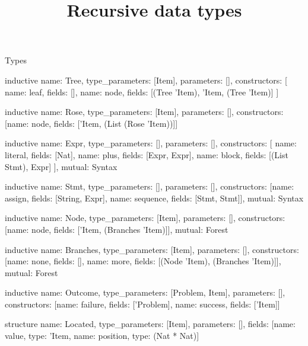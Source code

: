 \begin{lexlean}{Types}
\title{Recursive data types}
\begin{semanticmodule}
inductive{
  name: Tree,
  type_parameters: [Item],
  parameters: [],
  constructors: [
    {name: leaf, fields: []},
    {name: node, fields: [(Tree 'Item), 'Item, (Tree 'Item)]}
  ]
}

inductive{
  name: Rose,
  type_parameters: [Item],
  parameters: [],
  constructors: [{name: node, fields: ['Item, (List (Rose 'Item))]}]
}

inductive{
  name: Expr,
  type_parameters: [],
  parameters: [],
  constructors: [
    {name: literal, fields: [Nat]},
    {name: plus, fields: [Expr, Expr]},
    {name: block, fields: [(List Stmt), Expr]}
  ],
  mutual: Syntax
}

inductive{
  name: Stmt,
  type_parameters: [],
  parameters: [],
  constructors: [{name: assign, fields: [String, Expr]}, {name: sequence, fields: [Stmt, Stmt]}],
  mutual: Syntax
}

inductive{
  name: Node,
  type_parameters: [Item],
  parameters: [],
  constructors: [{name: node, fields: ['Item, (Branches 'Item)]}],
  mutual: Forest
}

inductive{
  name: Branches,
  type_parameters: [Item],
  parameters: [],
  constructors: [{name: none, fields: []}, {name: more, fields: [(Node 'Item), (Branches 'Item)]}],
  mutual: Forest
}

inductive{
  name: Outcome,
  type_parameters: [Problem, Item],
  parameters: [],
  constructors: [{name: failure, fields: ['Problem]}, {name: success, fields: ['Item]}]
}

structure{
  name: Located,
  type_parameters: [Item],
  parameters: [],
  fields: [{name: value, type: 'Item}, {name: position, type: (Nat * Nat)}]
}
\end{semanticmodule}
\end{lexlean}
